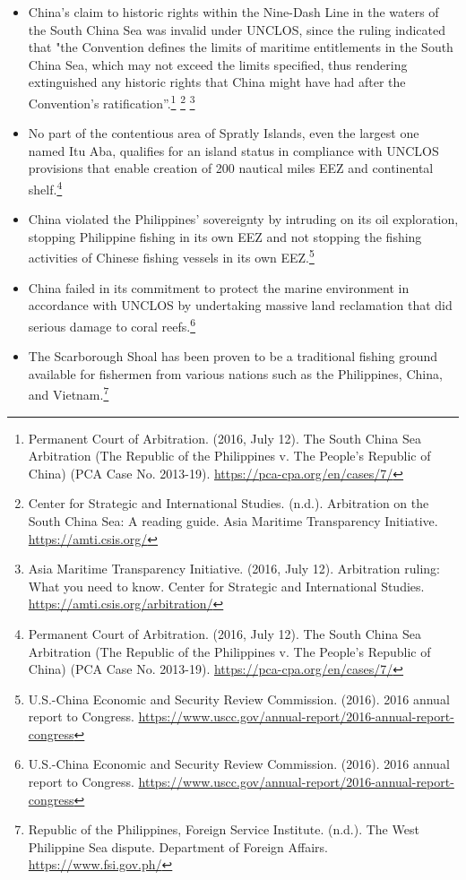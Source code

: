 \begin{itemize}
  \item China's claim to historic rights within the Nine-Dash Line in the waters of the South China Sea was invalid under UNCLOS, since the ruling indicated that "the Convention defines the limits of maritime entitlements in the South China Sea, which may not exceed the limits specified, thus rendering extinguished any historic rights that China might have had after the Convention's ratification”.\footnote{Permanent Court of Arbitration. (2016, July 12). The South China Sea Arbitration (The Republic of the Philippines v. The People's Republic of China) (PCA Case No. 2013-19). \url{https://pca-cpa.org/en/cases/7/}} \footnote{Center for Strategic and International Studies. (n.d.). Arbitration on the South China Sea: A reading guide. Asia Maritime Transparency Initiative. \url{https://amti.csis.org/}} \footnote{Asia Maritime Transparency Initiative. (2016, July 12). Arbitration ruling: What you need to know. Center for Strategic and International Studies. \url{https://amti.csis.org/arbitration/}}
  \item No part of the contentious area of Spratly Islands, even the largest one named Itu Aba, qualifies for an island status in compliance with UNCLOS provisions that enable creation of 200 nautical miles EEZ and continental shelf.\footnote{Permanent Court of Arbitration. (2016, July 12). The South China Sea Arbitration (The Republic of the Philippines v. The People's Republic of China) (PCA Case No. 2013-19). \url{https://pca-cpa.org/en/cases/7/}}
  \item China violated the Philippines’ sovereignty by intruding on its oil exploration, stopping Philippine fishing in its own EEZ and not stopping the fishing activities of Chinese fishing vessels in its own EEZ.\footnote{U.S.-China Economic and Security Review Commission. (2016). 2016 annual report to Congress. \url{https://www.uscc.gov/annual-report/2016-annual-report-congress}}
  \item China failed in its commitment to protect the marine environment in accordance with UNCLOS by undertaking massive land reclamation that did serious damage to coral reefs.\footnote{U.S.-China Economic and Security Review Commission. (2016). 2016 annual report to Congress. \url{https://www.uscc.gov/annual-report/2016-annual-report-congress}}
  \item The Scarborough Shoal has been proven to be a traditional fishing ground available for fishermen from various nations such as the Philippines, China, and Vietnam.\footnote{Republic of the Philippines, Foreign Service Institute. (n.d.). The West Philippine Sea dispute. Department of Foreign Affairs. \url{https://www.fsi.gov.ph/}}
\end{itemize}

